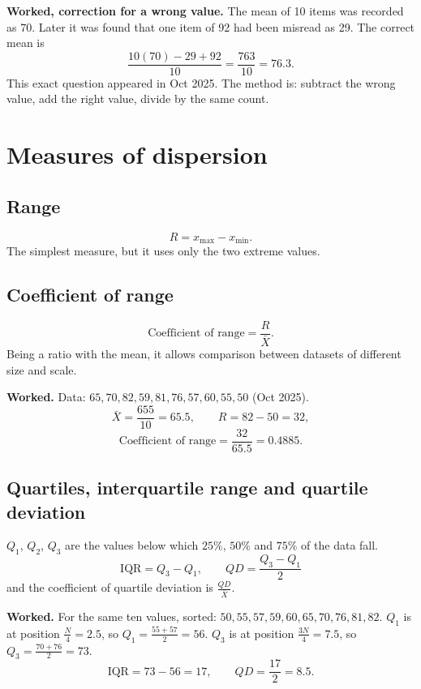 \documentclass[11pt,a4paper]{article}
\begin{document}
\begin{exambox}
\textbf{Worked, correction for a wrong value.} The mean of 10 items was recorded as 70. Later it was found that one item of 92 had been misread as 29. The correct mean is
\[
\frac{10(70)-29+92}{10}=\frac{763}{10}=\boxed{76.3}.
\]
This exact question appeared in Oct 2025. The method is: subtract the wrong value, add the right value, divide by the same count.
\end{exambox}

\section{Measures of dispersion}

\subsection{Range}
\[
R=x_{\max}-x_{\min}.
\]
The simplest measure, but it uses only the two extreme values.

\subsection{Coefficient of range}
\[
\text{Coefficient of range}=\frac{R}{\bar X}.
\]
Being a ratio with the mean, it allows comparison between datasets of different size and scale.

\begin{exambox}
\textbf{Worked.} Data: $65,70,82,59,81,76,57,60,55,50$ (Oct 2025).
\[
\bar X=\frac{655}{10}=65.5,\qquad R=82-50=32,
\]
\[
\text{Coefficient of range}=\frac{32}{65.5}=\boxed{0.4885}.
\]
\end{exambox}

\subsection{Quartiles, interquartile range and quartile deviation}
$Q_1$, $Q_2$, $Q_3$ are the values below which $25\%$, $50\%$ and $75\%$ of the data fall.
\[
\text{IQR}=Q_3-Q_1,\qquad \boxed{QD=\frac{Q_3-Q_1}{2}}
\]
and the coefficient of quartile deviation is $\frac{QD}{\bar X}$.

\begin{exambox}
\textbf{Worked.} For the same ten values, sorted: $50,55,57,59,60,65,70,76,81,82$.
$Q_1$ is at position $\frac{N}{4}=2.5$, so $Q_1=\frac{55+57}{2}=56$.
$Q_3$ is at position $\frac{3N}{4}=7.5$, so $Q_3=\frac{70+76}{2}=73$.
\[
\text{IQR}=73-56=17,\qquad QD=\frac{17}{2}=\boxed{8.5}.
\]
\end{exambox}
\end{document}
